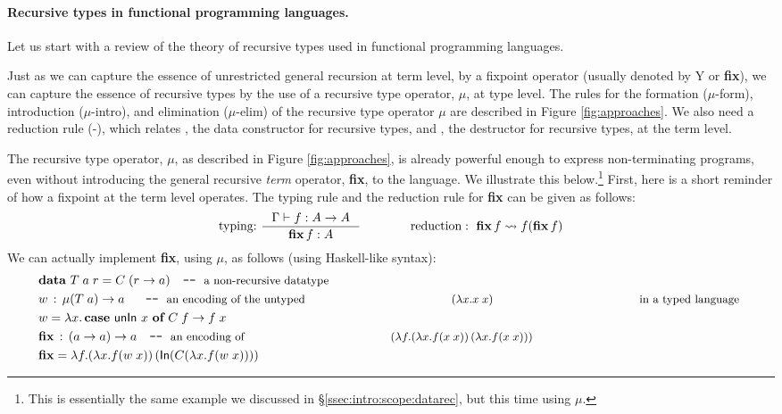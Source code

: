 \paragraph{Recursive types in functional programming languages.}
Let us start with a review of the theory of recursive types used
in functional programming languages.

Just as we can capture the essence of unrestricted general recursion at term
level, by a fixpoint operator (usually denoted by \textsf{Y} or \textbf{fix}),
we can capture the essence of recursive types by the
use of a recursive type operator, $\mu$, at type level. 
The rules for the formation {\small($\mu$-form)},
introduction {\small($\mu$-intro)}, and elimination {\small($\mu$-elim)} of
the recursive type operator $\mu$ are described in Figure \ref{fig:approaches}.
We also need a reduction rule {\small(\unIn-\In)}, which relates \In,
the data constructor for recursive types, and \unIn, the destructor for
recursive types, at the term level.

The recursive type operator, $\mu$, as described in Figure \ref{fig:approaches},
is already powerful enough to express non-terminating programs, even without
introducing the general recursive {\em term} operator, \textbf{fix},
to the language. We illustrate this below.\footnote{This is essentially
	the same example we discussed in \S\ref{ssec:intro:scope:datarec},
	but this time using $\mu$.}
First, here is a short reminder of how a fixpoint at the term level operates.
The typing rule and the reduction rule for \textbf{fix} can be given as follows:
\[ \text{typing:}~ \inference{\Gamma |- f : A -> A}{\textbf{fix}\,f : A}
 \qquad\qquad
   \text{reduction}:~ \textbf{fix}\,f \rightsquigarrow f(\textbf{fix}\,f)
\]
We can actually implement \textbf{fix}, using $\mu$, as follows
(using Haskell-like syntax):
\begin{align*}
& \textbf{data}~T\;a\;r = C\;(r -> a) \quad
          \texttt{-}\texttt{-}~\text{\small a non-recursive datatype} \\
& w \,:\, \mu(T\;a) -> a ~~ \quad
          \texttt{-}\texttt{-}~\text{\small an encoding of the untyped
                                     $(\lambda x.x\;x)$
                                     in a typed language}~ \\
& w = \lambda x . \,\textbf{case}~\mathsf{unIn}~x~\textbf{of}~C\;f -> f\;x \\
& \textbf{fix} \,:\, (a -> a) -> a \quad
          \texttt{-}\texttt{-}~\text{\small an encoding of 
                                     $(\lambda f.(\lambda x.f(x\;x))\,
                                                 (\lambda x.f(x\;x)))$} \\
& \textbf{fix} = \lambda f. (\lambda x. f (w\;x))\,(\mathsf{In}(C(\lambda x. f (w\;x))))
\end{align*}

